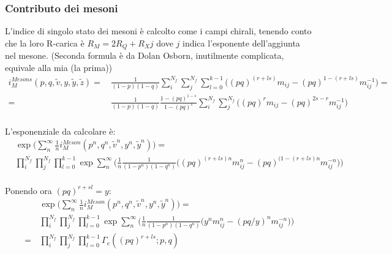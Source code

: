 \documentclass[a4paper,12pt]{report}
\begin{document}
\subsubsection{Contributo dei mesoni}
L'indice di singolo stato dei mesoni è calcolto come i campi chirali, tenendo conto che la loro R-carica è $ R_M = 2 R_Q + R_X j$ dove $j$ indica l'esponente dell'aggiunta nel mesone.
(Seconda formula è da Dolan Osborn, inutilmente complicata, equivale alla mia (la prima))
\begin{align*}
 i_M^{Mesons} (p,q, \tilde v, y,\tilde y ,\tilde z) = 
\,  &\frac{1}{(1-p)(1-q)} \sum_i^{N_f} \sum_j^{N_f}   \sum_{l=0}^{k-1}  \bigg( (pq)^{( r+ l s  )}m_{ij}  - (pq)^{1 -( r + l s )}
m_{ij}^{-1} \bigg) = \\ 
= \, & \frac{1}{(1-p)(1-q)}\frac{1 - (pq)^{1-s}}{1 - (pq)^s}  \sum_i^{N_f} \sum_j^{N_f}  \bigg( (pq)^r
m_{ij} - (pq)^{2s-r} 
m_{ij}^{-1} \bigg)\\
\end{align*}

L'esponenziale da calcolare è:
\begin{align*}
& \exp \bigg( \sum_{n}^{\infty} \frac{1}{n} i_M^{Meson} (p^n,q^n, \tilde v^n, y^n,\tilde y^n) \bigg) = \\
& \prod_i^{N_f} \prod_j^{N_f}  \prod_{l=0}^{k-1} \exp \sum_{n}^{\infty} \bigg( \frac{1}{n}  \frac{1}{(1-p^n)(1-q^n)} \bigg( (pq)^{(r + l s )n}
m_{ij}^n - (pq)^{(1-(r + l s )n} 
m_{ij}^{-n} \bigg) \bigg) \\
\end{align*}

Ponendo ora $ (pq)^{r+sl} = y$:
\begin{align*}
& \exp \bigg( \sum_{n}^{\infty} \frac{1}{n} i_M^{Meson} (p^n,q^n, \tilde v^n, y^n,\tilde y^n) \bigg) = \\
& \prod_i^{N_f} \prod_j^{N_f}  \prod_{l=0}^{k-1} \exp \sum_{n}^{\infty} \bigg( \frac{1}{n}  \frac{1}{(1-p^n)(1-q^n)} \bigg( y^n
m_{ij}^n - (pq/y)^{n} 
m_{ij}^{-n} \bigg) \bigg)\\
= \, & \prod_i^{N_f} \prod_j^{N_f}  \prod_{l=0}^{k-1} \Gamma_e ( (pq)^{r + l s} ; p ,q)
\end{align*}
\end{document}
